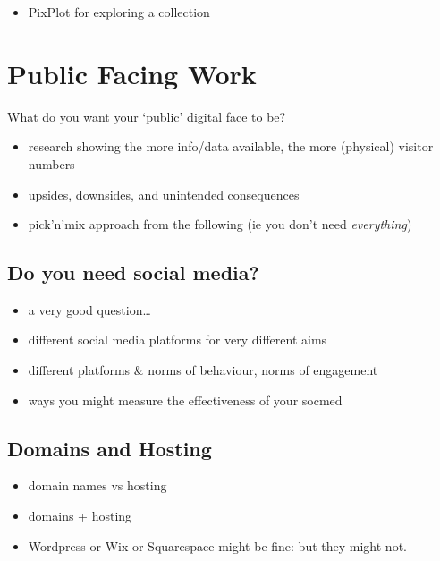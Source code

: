 \documentclass[
]{book}
\providecommand{\tightlist}{%
  \setlength{\itemsep}{0pt}\setlength{\parskip}{0pt}}
\begin{document}
\begin{itemize}
\tightlist
\item
  PixPlot for exploring a collection
\end{itemize}

\hypertarget{public-facing-work}{%
\chapter{Public Facing Work}\label{public-facing-work}}

What do you want your `public' digital face to be?

\begin{itemize}
\item
  research showing the more info/data available, the more (physical) visitor numbers
\item
  upsides, downsides, and unintended consequences
\item
  pick'n'mix approach from the following (ie you don't need \emph{everything})
\end{itemize}

\hypertarget{do-you-need-social-media}{%
\section{Do you need social media?}\label{do-you-need-social-media}}

\begin{itemize}
\tightlist
\item
  a very good question\ldots{}
\item
  different social media platforms for very different aims
\item
  different platforms \& norms of behaviour, norms of engagement
\item
  ways you might measure the effectiveness of your socmed
\end{itemize}

\hypertarget{domains-and-hosting}{%
\section{Domains and Hosting}\label{domains-and-hosting}}

\begin{itemize}
\tightlist
\item
  domain names vs hosting
\item
  domains + hosting
\item
  Wordpress or Wix or Squarespace might be fine: but they might not.
\end{itemize}
\end{document}
